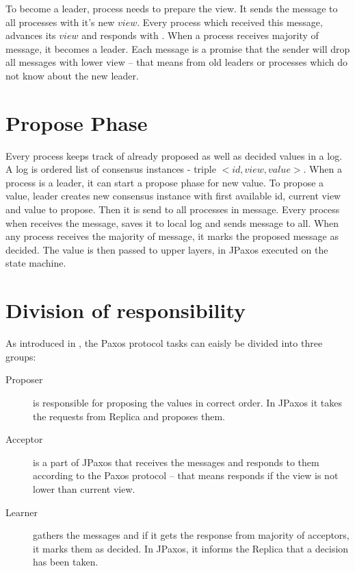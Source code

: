To become a leader, process needs to prepare the view. It sends the \prepare message to all processes with it's new $view$. Every process which received this message, advances its $view$ and responds with \prepareOK. When a process receives majority of \prepareOK message, it becomes a leader. Each \prepareOK message is a promise that the sender will drop all messages with lower view -- that means from old leaders or processes which do not know about the new leader.

\section{Propose Phase}

Every process keeps track of already proposed as well as decided values in a log. A log is ordered list of consensus instances - triple $<id, view, value>$. When a process is a leader, it can start a propose phase for new value. To propose a value, leader creates new consensus instance with first available id, current view and value to propose. Then it is send to all processes in \propose message. Every process when receives the \propose message, saves it to local log and sends \accept message to all. When any process receives the majority of \accept message, it marks the proposed message as decided. The value is then passed to upper layers, in JPaxos executed on the state machine.

\section{Division of responsibility}

As introduced in \cite{Lam01}, the Paxos protocol tasks can eaisly be divided into three groups:
\begin{description}
 \item[Proposer] is responsible for proposing the values in correct order. In JPaxos it takes the requests from Replica and proposes them.
 
 \item[Acceptor] is a part of JPaxos that receives the \propose messages and responds to them according to the Paxos protocol -- that means responds if the view is not lower than current view.
 
 \item[Learner] gathers the \accept messages and if it gets the response from majority of acceptors, it marks them as decided. In JPaxos, it informs the Replica that a decision has been taken.
\end{description}

